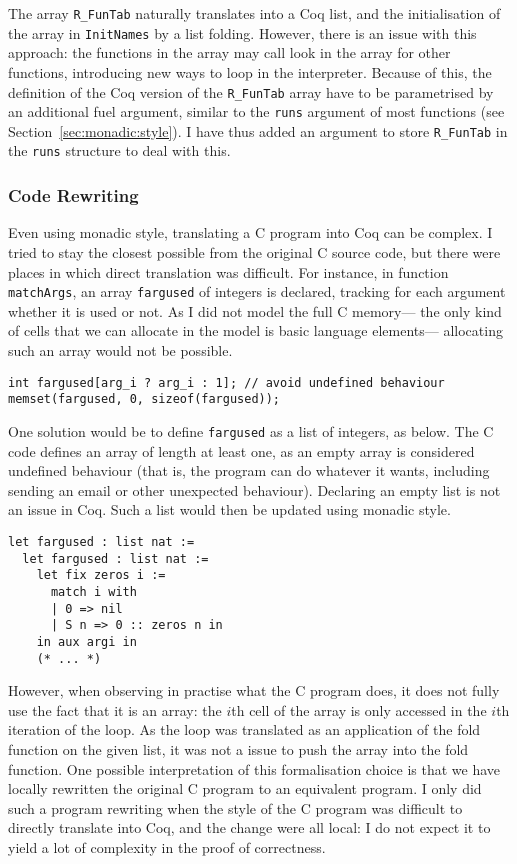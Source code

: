 \documentclass{article}
\newcommand\Coq{Coq}
\newcommand\Cn{C}
\begin{document}
The array \texttt{R_FunTab} naturally translates
into a \Coq{} list,
and the initialisation of the array in \texttt{InitNames}
by a list folding.
However, there is an issue with this approach:
the functions in the array may call look in the array
for other functions,
introducing new ways to loop in the interpreter.
Because of this, the definition of the \Coq{} version
of the \texttt{R_FunTab} array have to be parametrised
by an additional fuel argument,
similar to the \texttt{runs} argument of most functions
(see Section~\ref{sec:monadic:style}).
I have thus added an argument to store \texttt{R_FunTab}
in the \texttt{runs} structure to deal with this.


\subsubsection{Code Rewriting}
\label{sec:code:rewriting}

Even using monadic style,
translating a \Cn{} program into \Coq{} can be complex.
I tried to stay the closest possible from the original
\Cn{} source code,
but there were places in which direct translation was difficult.
For instance, in function \texttt{matchArgs},
an array \texttt{fargused} of integers is declared,
tracking for each argument whether it is used or not.
As I did not model the full \Cn{} memory—%
the only kind of cells that we can allocate in the model
is basic language elements—%
allocating such an array would not be possible.
\begin{verbatim}
int fargused[arg_i ? arg_i : 1]; // avoid undefined behaviour
memset(fargused, 0, sizeof(fargused));
\end{verbatim}

One solution would be to define \texttt{fargused}
as a list of integers, as below.
The \Cn{} code defines an array of length at least one,
as an empty array is considered undefined behaviour
(that is, the program can do whatever it wants,
including sending an email or other unexpected behaviour).
Declaring an empty list is not an issue in \Coq{}.
Such a list would then be updated using monadic style.
\begin{verbatim}
let fargused : list nat :=
  let fargused : list nat :=
    let fix zeros i :=
      match i with
      | 0 => nil
      | S n => 0 :: zeros n in
    in aux argi in
    (* ... *)
\end{verbatim}

However, when observing in practise what the \Cn{} program
does, it does not fully use the fact that it is an array:
the \(i\)th cell of the array is only accessed in the \(i\)th
iteration of the loop.
As the loop was translated as an application of the fold function
on the given list,
it was not a issue to push the array into the fold function.
One possible interpretation of this formalisation choice
is that we have locally rewritten the original \Cn{} program
to an equivalent program.
I only did such a program rewriting when the style of the \Cn{}
program was difficult to directly translate into \Coq{},
and the change were all local:
I do not expect it to yield a lot of complexity in the proof of correctness.
\end{document}
